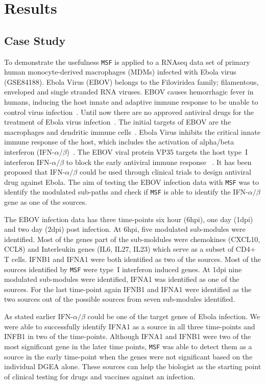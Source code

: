 \documentclass[twocolumn]{article}
\begin{document}
\section*{Results}

\subsection*{Case Study}

To demonstrate the usefulness \texttt{MSF} is applied to a RNAseq data
set of primary human monocyte-derived macrophages (MDMs) infected with
Ebola virus~\cite{Olejnik} (GSE84188). Ebola Virus (EBOV)
belongs to the Filoviridea family; filamentous, enveloped and single
stranded RNA viruses. EBOV causes hemorrhagic fever in humans,
inducing the host innate and adaptive immune response to be unable to
control virus infection~\cite{Prins}. Until now there are no approved
antiviral drugs for the treatment of Ebola virus infection~\cite{Konde,Rhein}. 
The initial targets of EBOV are the macrophages and
dendritic immune cells~\cite{Falasca,Rhein}. Ebola Virus inhibits the critical
innate immune response of the host, which includes the activation of
alpha/beta interferon (IFN-$\alpha /
\beta$)~\cite{Prins,Konde,Cardenas}. The EBOV viral protein VP35
targets the host type~I interferon IFN-$\alpha / \beta$ to block the
early antiviral immune response
~\cite{Prins,Konde,Falasca,Cardenas,Olejnik}. It has been proposed
that IFN-$\alpha / \beta$ could be used through clinical trials to
design antiviral drug against Ebola. The aim of testing the EBOV infection data with \texttt{MSF} was to  identify the modulated sub-paths and check if \texttt{MSF} is able to identify the IFN-$\alpha / \beta$ gene as one of the sources.

The EBOV infection data has three time-points six hour (6hpi), one day (1dpi) and two day (2dpi) post infection. At 6hpi, five modulated sub-modules were identified. Most of the genes part of the sub-moldules were chemokines (CXCL10, CCL8) and Interleukin genes (IL6, IL27, IL23) which serve as a subset of CD4+ T
cells. IFNB1  and IFNA1 were both identified as two of the sources. Most of the sources identified by \texttt{MSF} were type~I interferon induced genes. At 1dpi nine modulated sub-modules were identified, IFNA1 was identified as one of the sources. For the last time-point again IFNB1 and IFNA1 were identified as the two sources out of the possible sources from seven sub-modules identified.

As stated earlier IFN-$\alpha / \beta$ could be one of the target
genes of Ebola infection. We were able to successfully identify IFNA1
as a source in all three time-points and INFB1 in two of the time-points. Although IFNA1 and IFNB1 were two of the most
significant gene in the later time points, \texttt{MSF} was able to detect them as
a source in the early time-point when the genes were not significant
based on the individual DGEA alone. These sources can help the biologist as the starting point of clinical testing for drugs and vaccines against an infection.
\end{document}
